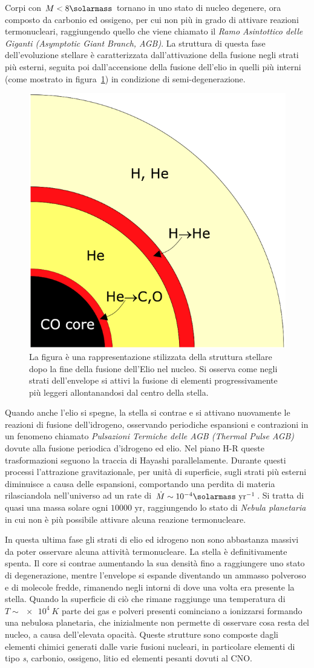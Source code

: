 Corpi con $M < 8\si{\solarmass}$ tornano in uno stato di nucleo degenere, ora composto da carbonio ed ossigeno, per cui non più in grado di attivare reazioni termonucleari, raggiungendo quello che viene chiamato il \textit{Ramo Asintottico delle Giganti (Asymptotic Giant Branch, AGB)}. La struttura di questa fase dell'evoluzione stellare è caratterizzata dall'attivazione della fusione negli strati più esterni, seguita poi dall'accensione della fusione dell'elio in quelli più interni (come mostrato in figura~\ref{fig:AGB}) in condizione di semi-degenerazione.
\begin{figure}
    \centering
    \includegraphics[width = 0.3 \textwidth]{immagini/AGB.png}
    \caption{La figura è una rappresentazione stilizzata della struttura stellare dopo la fine della fusione dell'Elio nel nucleo. Si osserva come negli strati dell'envelope si attivi la fusione di elementi progressivamente più leggeri allontanandosi dal centro della stella.}\label{fig:AGB}
\end{figure}
Quando anche l'elio si spegne, la stella si contrae e si attivano nuovamente le reazioni di fusione dell'idrogeno, osservando periodiche espansioni e contrazioni in un fenomeno chiamato \textit{Pulsazioni Termiche delle AGB (Thermal Pulse AGB)} dovute alla fusione periodica d'idrogeno ed elio. Nel piano H-R queste trasformazioni seguono la traccia di Hayashi parallelamente. Durante questi processi l'attrazione gravitazionale, per unità di superficie, sugli strati più esterni diminuisce a causa delle espansioni, comportando una perdita di materia rilasciandola nell'universo ad un rate di $\dot{M} \sim 10^{-4} \si{\solarmass} \mbox{ yr}^{-1}$. Si tratta di quasi una massa solare ogni $10000 \mbox{ yr}$, raggiungendo lo stato di \textit{Nebula planetaria} in cui non è più possibile attivare alcuna reazione termonucleare.

In questa ultima fase gli strati di elio ed idrogeno non sono abbastanza massivi da poter osservare alcuna attività termonucleare. La stella è definitivamente spenta. Il core si contrae aumentando la sua densità fino a raggiungere uno stato di degenerazione, mentre l'envelope si espande diventando un ammasso polveroso e di molecole fredde, rimanendo negli intorni di dove una volta era presente la stella. Quando la superficie di ciò che rimane raggiunge una temperatura di $T \sim \SI{e4}{K}$ parte dei gas e polveri presenti cominciano a ionizzarsi formando una nebulosa planetaria, che inizialmente non permette di osservare cosa resta del nucleo, a causa dell'elevata opacità. Queste strutture sono composte dagli elementi chimici generati dalle varie fusioni nucleari, in particolare elementi di tipo \textit{s}, carbonio, ossigeno, litio ed elementi pesanti dovuti al CNO.